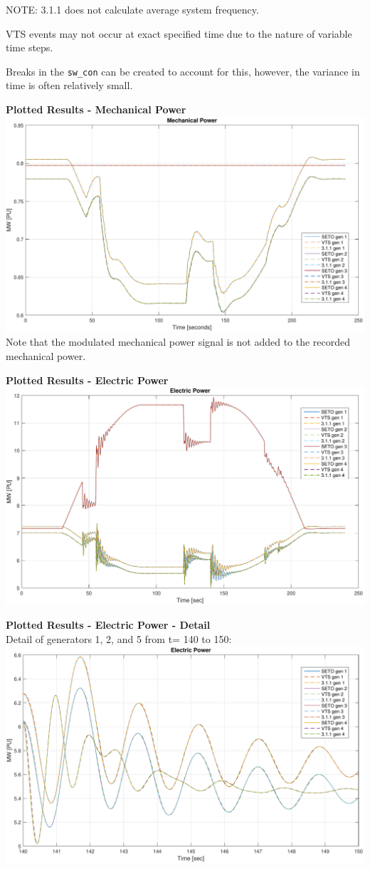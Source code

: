 NOTE: 3.1.1 does not calculate average system frequency.

VTS events may not occur at exact specified time due to the nature of variable time steps.

Breaks in the \verb|sw_con| can be created to account for this, however, the variance in time is often relatively small.


\pagebreak
\textbf{Plotted Results - Mechanical Power} \ \\
\includegraphics[width=\linewidth]{examples/extendedTerm/verPmech}
Note that the modulated mechanical power signal is not added to the recorded mechanical power.


\textbf{Plotted Results - Electric Power} \ \\
\includegraphics[width=\linewidth]{examples/extendedTerm/verPelect}

\textbf{Plotted Results - Electric Power - Detail} \ \\
Detail of generators 1, 2, and 5 from t= 140 to 150:\\
\includegraphics[width=\linewidth]{examples/extendedTerm/verPelectDetail}